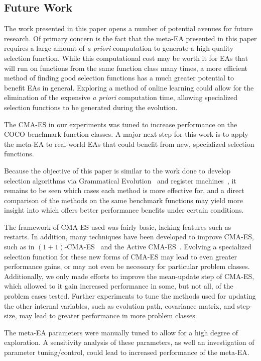 \documentclass[sigconf]{acmart}
\begin{document}
\subsection{Future Work}
\label{Future Work}
The work presented in this paper opens a number of potential avenues for future research. Of primary concern is the fact that the meta-EA presented in this paper requires a large amount of \textit{a priori} computation to generate a high-quality selection function. While this computational cost may be worth it for EAs that will run on functions from the same function class many times, a more efficient method of finding good selection functions has a much greater potential to benefit EAs in general. Exploring a method of online learning could allow for the elimination of the expensive \textit{a priori} computation time, allowing specialized selection functions to be generated during the evolution.

The CMA-ES in our experiments was tuned to increase performance on the COCO benchmark function classes. A major next step for this work is to apply the meta-EA to real-world EAs that could benefit from new, specialized selection functions.

Because the objective of this paper is similar to the work done to develop selection algorithms via Grammatical Evolution~\citep{lourencco2013selection} and register machines~\citep{woodward2011selection}, it remains to be seen which cases each method is more effective for, and a direct comparison of the methods on the same benchmark functions may yield more insight into which offers better performance benefits under certain conditions.

The framework of CMA-ES used was fairly basic, lacking features such as restarts. In addition, many techniques have been developed to improve CMA-ES, such as in $(1+1)$-CMA-ES~\citep{igel2006cmaes1plus1} and the Active CMA-ES~\citep{jastrebski2006activecmaes}. Evolving a specialized selection function for these new forms of CMA-ES may lead to even greater performance gains, or may not even be necessary for particular problem classes. Additionally, we only made efforts to improve the mean-update step of CMA-ES, which allowed to it gain increased performance in some, but not all, of the problem cases tested. Further experiments to tune the methods used for updating the other internal variables, such as evolution path, covariance matrix, and step-size, may lead to greater performance in more problem classes.

The meta-EA parameters were manually tuned to allow for a high degree of exploration. A sensitivity analysis of these parameters, as well an investigation of parameter tuning/control, could lead to increased performance of the meta-EA.


 
\end{document}
